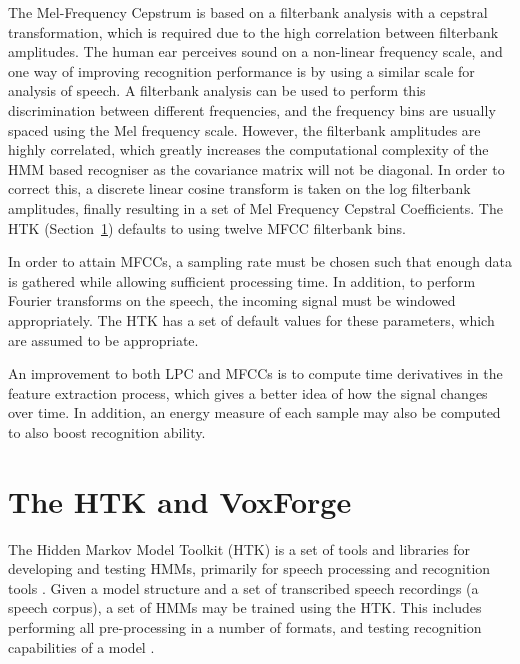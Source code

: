 	The Mel-Frequency Cepstrum is based on a filterbank analysis with a cepstral transformation, which is required due to the high correlation between filterbank amplitudes.  The human ear perceives sound on a non-linear frequency scale, and one way of improving recognition performance is by using a similar scale for analysis of speech.  A filterbank analysis can be used to perform this discrimination between different frequencies, and the frequency bins are usually spaced using the Mel frequency scale.  However, the filterbank amplitudes are highly correlated, which greatly increases the computational complexity of the HMM based recogniser as the covariance matrix will not be diagonal.  In order to correct this, a discrete linear cosine transform is taken on the log filterbank amplitudes, finally resulting in a set of Mel Frequency Cepstral Coefficients.  The HTK (Section~\ref{sec:the_htk}) defaults to using twelve MFCC filterbank bins. \cite{htkbook} \cite{melnikoff2003speech}

	In order to attain MFCCs, a sampling rate must be chosen such that enough data is gathered while allowing sufficient processing time.  In addition, to perform Fourier transforms on the speech, the incoming signal must be windowed appropriately.  The HTK has a set of default values for these parameters, which are assumed to be appropriate.

	An improvement to both LPC and MFCCs is to compute time derivatives in the feature extraction process, which gives a better idea of how the signal changes over time.  In addition, an energy measure of each sample may also be computed to also boost recognition ability.


\section{The HTK and VoxForge} %
\label{sec:the_htk}
	The Hidden Markov Model Toolkit (HTK) is a set of tools and libraries for developing and testing HMMs, primarily for speech processing and recognition tools \cite{htkbook}.  Given a model structure and a set of transcribed speech recordings (a speech corpus), a set of HMMs may be trained using the HTK.  This includes performing all pre-processing in a number of formats, and testing recognition capabilities of a model \cite{woodland1994htk}.

